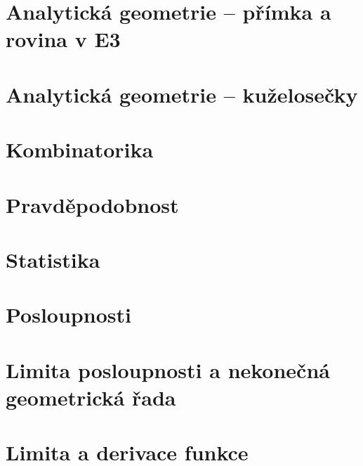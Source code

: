 \documentclass[12pt, a4paper]{article}
\begin{document}
\section{Analytická geometrie – přímka a rovina v E3}
\section{Analytická geometrie – kuželosečky}
\section{Kombinatorika}
\section{Pravděpodobnost}
\section{Statistika}
\section{Posloupnosti}
\section{Limita posloupnosti a nekonečná geometrická řada}
\section{Limita a derivace funkce}
\end{document}
